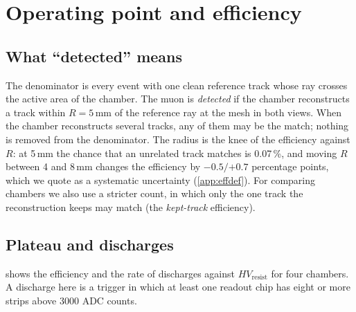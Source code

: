 \section{Operating point and efficiency}\label{sec:efficiency}

\subsection{What ``detected'' means}\label{sec:effdef}
The denominator is every event with one clean reference track whose ray crosses the active area of the chamber.
The muon is \emph{detected} if the chamber reconstructs a track within $R=5$\,mm of the reference ray at the mesh in
both views. When the chamber reconstructs several tracks, any of them may be the match; nothing is removed from the
denominator. The radius is the knee of the efficiency against $R$: at 5\,mm the chance that an unrelated track matches
is 0.07\,\%, and moving $R$ between 4 and 8\,mm changes the efficiency by $-0.5/{+0.7}$ percentage points, which we
quote as a systematic uncertainty (\cref{app:effdef}). For comparing chambers we also use a stricter count, in which
only the one track the reconstruction keeps may match (the \emph{kept-track} efficiency).

\subsection{Plateau and discharges}\label{sec:hvscan}
 shows the efficiency and the rate of discharges against $HV_\mathrm{resist}$ for four chambers. A
discharge here is a trigger in which at least one readout chip has eight or more strips above 3000 ADC counts.

